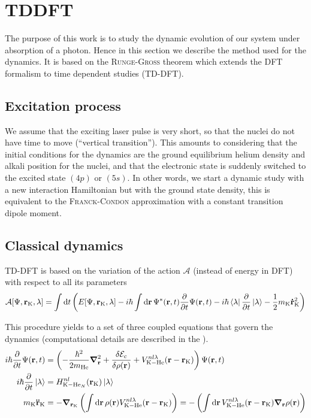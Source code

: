 \section{TDDFT}

The purpose of this work is to study the dynamic evolution of our system under absorption of a photon. 
Hence in this section we describe the method used for the dynamics.
It is based on the \textsc{Runge-Gross} theorem \cite{Run1984} which extends the DFT formalism to time dependent studies (TD-DFT).

\subsection{Excitation process}

We assume that the exciting laser pulse is very short, so that the nuclei do not have time to move (``vertical transition'').
This amounts to considering that the initial conditions for the dynamics are the ground equilibrium helium density and alkali position for the nuclei, and that the electronic state is suddenly switched to the excited state $(4p)$ or $(5s)$. In other words, we start a dynamic study with a new interaction Hamiltonian but with the ground state density, this is equivalent to the \textsc{Franck-Condon} approximation with a constant transition dipole moment.

\subsection{Classical dynamics}

TD-DFT is based on the variation of the action $\mathcal{A}$ (instead of energy in DFT) with respect to all its parameters
\begin{align}
\mathcal{A}[\Psi,\vb{r}_{\mathrm{K}},\lambda] = \int \dd{t} \left( E[\Psi,\vb{r}_{\mathrm{K}},\lambda] - i\hbar \int \dd{\vb{r}} \Psi^*(\vb{r},t) \pdv{t} \Psi(\vb{r},t) - i\hbar \bra{\lambda} \pdv{t} \ket{\lambda} - \frac{1}{2} m_{\mathrm{K}} \vb{\dot{r}}_{\mathrm{K}}^2\right)
\end{align}

This procedure yields to a set of three coupled equations that govern the dynamics (computational details are described in the ).
\begin{align}
i\hbar \pdv{t} \Psi(\vb{r},t)  &= \left(-\frac{\hbar^2}{2m_{\mathrm{He}}} \grad{}^2_{\vb{r}} + \frac{\delta \mathcal{E}_c}{\delta \rho(\vb{r})}  + V_{\mathrm{K-He}}^{nl\lambda} (\vb{r}-\vb{r}_{\mathrm{K}})\right) \Psi(\vb{r},t) \\
i\hbar \pdv{t} \ket{\lambda} &= H_{\mathrm{K-He}_N}^{nl}(\vb{r}_{\mathrm{K}}) \ket{\lambda} \\
m_{\mathrm{K}} \vb{\ddot{r}}_{\mathrm{K}} &= -\grad{}_{\vb{r}_{\mathrm{K}}} \left(\int \dd{\vb{r}} \rho(\vb{r}) V_{\mathrm{K-He}}^{nl\lambda}(\vb{r}-\vb{r}_{\mathrm{K}}) \right) = - \left(\int \dd{\vb{r}}  V_{\mathrm{K-He}}^{nl\lambda}(\vb{r}-\vb{r}_{\mathrm{K}})\grad{}_{\vb{r}}\rho(\vb{r}) \right)
\end{align}

